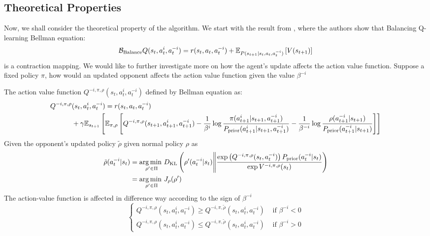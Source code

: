\subsection{Theoretical Properties}
\label{sec:chap3-balancing-Q-theoretical}
Now, we shall consider the theoretical property of the algorithm. We start with the result from \cite{grau2018balancing}, where the authors show that Balancing Q-learning Bellman equation:
\begin{equation}
    \mathcal{B}_{\text{Balance}} Q(s_t, a^i_t, a^{-i}_t) = r(s_t, a_t, a^{-i}_t) + \mathbb{E}_{P(s_{t+1} | s_t, a_t, a^{-i}_t)}\left[ V(s_{t+1}) \right]
\end{equation}
is a contraction mapping. We would like to further investigate more on how the agent's update affects the action value function. Suppose a fixed policy $\pi$, how would an updated opponent affects the action value function given the value $\beta^{-i}$
\begin{theorem}
\label{thm:update-balance-opponent}
    The action value function $Q^{-i, \pi, \rho}(s_t, a^i_t, a^{-i}_t)$ defined by Bellman equation as:
    \begin{equation}
    \begin{aligned}
        Q^{-i, \pi, \rho}&(s_t, a^i_t, a^{-i}_t) = r(s_t, a_t, a^{-i}_t) \\
        &+ \gamma\mathbb{E}_{s_{t+1}}\left[ \mathbb{E}_{\pi, \rho}\left[ Q^{-i, \pi, \rho}(s_{t+1}, a^i_{t+1}, a^{-i}_{t+1}) - \frac{1}{\beta^i} \log\frac{\pi(a^i_{t+1}|s_{t+1}, a^{-i}_{t+1})}{P_{\text{prior}}(a^i_{t+1}|s_{t+1}, a^{-i}_{t+1})} - \frac{1}{\beta^{-i}}\log \frac{\rho(a^{-i}_{t+1}|s_{t+1})}{P_{\text{prior}}(a^{-i}_{t+1}|s_{t+1})} \right] \right]
    \end{aligned}
    \end{equation}
    Given the opponent's updated policy $\tilde{\rho}$ given normal policy $\rho$ as 
    \begin{equation}
    \begin{aligned}
        \tilde{\rho}(a^{-i}_t | s_t) &= \underset{\rho' \in \Pi}{\arg\min \ } D_{\mathrm{KL}} \left(  \rho'(a^{-i}_t | s_t) \Bigg\| \frac{\exp\left( Q^{-i, \pi, \rho}(s_t, a^{-i}_t) \right) P_{\text{prior}}(a^{-i}_t | s_t)}{\exp V^{-i, \pi, \rho}(s_t)} \right) \\
        &=\underset{\rho' \in \Pi}{\arg\min \ } J_{\rho}(\rho')
    \end{aligned}
    \end{equation}
    The action-value function is affected in difference way according to the sign of $\beta^{-i}$
    \begin{equation}
    \begin{cases}
        Q^{-i, \pi, \rho}(s_t, a^i_t, a^{-i}_t) \ge Q^{-i, \pi, \tilde{\rho}}(s_t, a^i_t, a^{-i}_t) &\text{ if } \beta^{-i} < 0 \\
        Q^{-i, \pi, \rho}(s_t, a^i_t, a^{-i}_t) \le Q^{-i, \pi, \tilde{\rho}}(s_t, a^i_t, a^{-i}_t)&\text{ if } \beta^{-i} > 0
    \end{cases}
    \end{equation}
\end{theorem}

